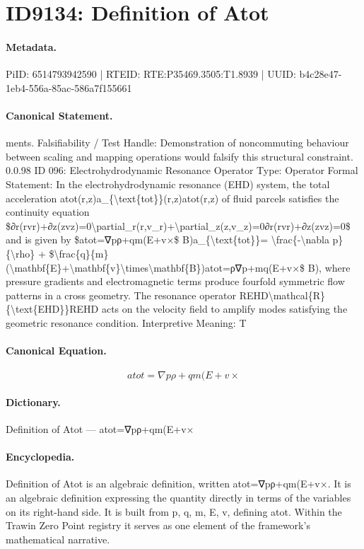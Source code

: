 \section*{ID9134: Definition of Atot}
\paragraph{Metadata.}
PiID: 6514793942590 | RTEID: RTE:P35469.3505:T1.8939 | UUID: b4c28e47-1eb4-556a-85ac-586a7f155661

\paragraph{Canonical Statement.}
ments. Falsifiability / Test Handle: Demonstration of noncommuting behaviour between scaling and mapping operations would falsify this structural constraint. 0.0.98 ID 096: Electrohydrodynamic Resonance Operator Type: Operator Formal Statement: In the electrohydrodynamic resonance (EHD) system, the total acceleration atot(r,z)a\_\{\textbackslash{}text\{tot\}\}(r,z)atot(r,z) of fluid parcels satisfies the continuity equation \$∂r(rvr)+∂z(zvz)=0\textbackslash{}partial\_r(r,v\_r)+\textbackslash{}partial\_z(z,v\_z)=0∂r(rvr)+∂z(zvz)=0\$ and is given by \$atot=∇pρ+qm(E+v×\$ B)a\_\{\textbackslash{}text\{tot\}\}= \textbackslash{}frac\{-\textbackslash{}nabla p\}\{\textbackslash{}rho\} + \$\textbackslash{}frac\{q\}\{m\}(\textbackslash{}mathbf\{E\}+\textbackslash{}mathbf\{v\}\textbackslash{}times\textbackslash{}mathbf\{B\})atot=ρ∇p+mq(E+v×\$ B), where pressure gradients and electromagnetic terms produce fourfold symmetric flow patterns in a cross geometry. The resonance operator REHD\textbackslash{}mathcal\{R\} \{\textbackslash{}text\{EHD\}\}REHD acts on the velocity field to amplify modes satisfying the geometric resonance condition. Interpretive Meaning: T

\paragraph{Canonical Equation.}
\[
atot=∇pρ+qm(E+v×
\]

\paragraph{Dictionary.}
Definition of Atot — atot=∇pρ+qm(E+v×

\paragraph{Encyclopedia.}
Definition of Atot is an algebraic definition, written atot=∇pρ+qm(E+v×. It is an algebraic definition expressing the quantity directly in terms of the variables on its right-hand side. It is built from p, q, m, E, v, defining atot. Within the Trawin Zero Point registry it serves as one element of the framework's mathematical narrative.
